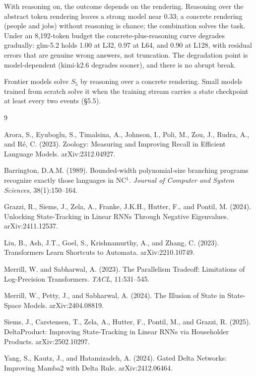 \documentclass[11pt]{article}
\newcommand{\Sfive}{$S_5$}
\begin{document}
With reasoning on, the outcome depends on the rendering. Reasoning over the abstract token
rendering leaves a strong model near 0.33; a concrete rendering (people and jobs) without reasoning is chance;
the combination solves the task. Under an 8{,}192-token budget the concrete-plus-reasoning
curve degrades gradually: glm-5.2 holds 1.00 at L32, 0.97 at L64, and 0.90 at L128, with
residual errors that are genuine wrong answers, not truncation. The degradation point is
model-dependent (kimi-k2.6 degrades sooner), and there is no abrupt break.

Frontier models solve \Sfive{} by reasoning over a concrete rendering. Small models trained
from scratch solve it when the training stream carries a state checkpoint at least every two
events (\S5.5).

\begin{thebibliography}{9}

Arora, S., Eyuboglu, S., Timalsina, A., Johnson, I., Poli, M., Zou, J., Rudra, A., and
R\'e, C. (2023). Zoology: Measuring and Improving Recall in Efficient Language Models.
arXiv:2312.04927.

Barrington, D.A.M. (1989). Bounded-width polynomial-size branching programs recognize exactly
those languages in NC$^1$. \emph{Journal of Computer and System Sciences}, 38(1):150--164.

Grazzi, R., Siems, J., Zela, A., Franke, J.K.H., Hutter, F., and Pontil, M. (2024). Unlocking
State-Tracking in Linear RNNs Through Negative Eigenvalues. arXiv:2411.12537.

Liu, B., Ash, J.T., Goel, S., Krishnamurthy, A., and Zhang, C. (2023). Transformers Learn
Shortcuts to Automata. arXiv:2210.10749.

Merrill, W. and Sabharwal, A. (2023). The Parallelism Tradeoff: Limitations of Log-Precision
Transformers. \emph{TACL}, 11:531--545.

Merrill, W., Petty, J., and Sabharwal, A. (2024). The Illusion of State in State-Space Models.
arXiv:2404.08819.

Siems, J., Carstensen, T., Zela, A., Hutter, F., Pontil, M., and Grazzi, R. (2025).
DeltaProduct: Improving State-Tracking in Linear RNNs via Householder Products.
arXiv:2502.10297.

Yang, S., Kautz, J., and Hatamizadeh, A. (2024). Gated Delta Networks: Improving Mamba2 with
Delta Rule. arXiv:2412.06464.

\end{thebibliography}
\end{document}
